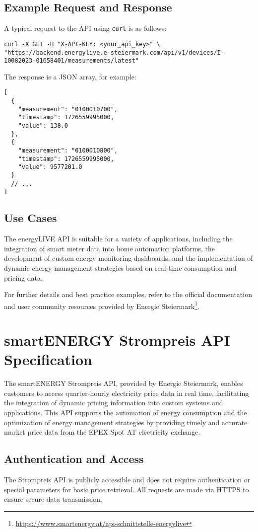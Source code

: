 \subsection{Example Request and Response}
A typical request to the API using \texttt{curl} is as follows:
\begin{verbatim}
curl -X GET -H "X-API-KEY: <your_api_key>" \
"https://backend.energylive.e-steiermark.com/api/v1/devices/I-10082023-01658401/measurements/latest"
\end{verbatim}

The response is a JSON array, for example:
\begin{verbatim}
[
  {
    "measurement": "0100010700",
    "timestamp": 1726559995000,
    "value": 138.0
  },
  {
    "measurement": "0100010800",
    "timestamp": 1726559995000,
    "value": 9577201.0
  }
  // ...
]
\end{verbatim}

\subsection{Use Cases}
The energyLIVE API is suitable for a variety of applications, including the integration of smart meter data into home automation platforms, the development of custom energy monitoring dashboards, and the implementation of dynamic energy management strategies based on real-time consumption and pricing data.

For further details and best practice examples, refer to the official documentation and user community resources provided by Energie Steiermark\footnote{\url{https://www.smartenergy.at/api-schnittstelle-energylive}}.

\newpage
\section{smartENERGY Strompreis API Specification}
\label{appendix:strompreis-api}

The smartENERGY Strompreis API, provided by Energie Steiermark, enables customers to access quarter-hourly electricity price data in real time, facilitating the integration of dynamic pricing information into custom systems and applications. This API supports the automation of energy consumption and the optimization of energy management strategies by providing timely and accurate market price data from the EPEX Spot AT electricity exchange.

\subsection{Authentication and Access}
The Strompreis API is publicly accessible and does not require authentication or special parameters for basic price retrieval. All requests are made via HTTPS to ensure secure data transmission.

